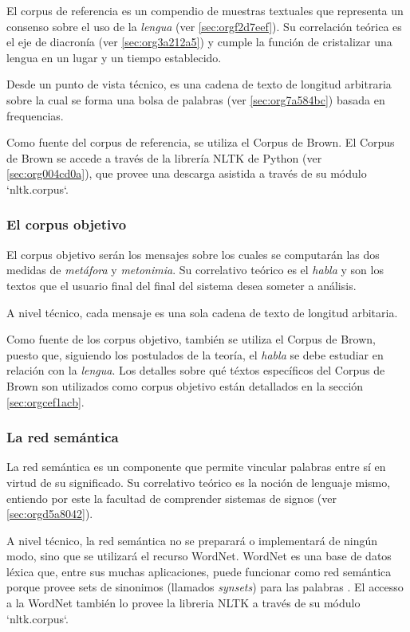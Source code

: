 \documentclass[12pt,letterpaper,twoside]{article}
\begin{document}
El corpus de referencia es un compendio de muestras textuales que
representa un consenso sobre el uso de la \emph{lengua}
(ver \ref{sec:orgf2d7eef}). Su correlación teórica es el eje de diacronía (ver
\ref{sec:org3a212a5}) y cumple la función de cristalizar una
lengua en un lugar y un tiempo establecido.

Desde un punto de vista técnico, es una cadena de texto de
longitud arbitraria sobre la cual se forma una bolsa de palabras
(ver \ref{sec:org7a584bc}) basada en frequencias.

Como fuente del corpus de referencia, se utiliza el Corpus de
Brown. El Corpus de Brown se accede a través de la librería NLTK
de Python (ver \ref{sec:org004cd0a}), que provee una descarga asistida a través
de su módulo `nltk.corpus`.


\subsubsection{El corpus objetivo}
\label{sec:org58e41f0}

El corpus objetivo serán los mensajes sobre los cuales se
computarán las dos medidas de \emph{metáfora} y \emph{metonimia}.  Su
correlativo teórico es el \emph{habla} y son los textos que el usuario
final del final del sistema desea someter a análisis.

A nivel técnico, cada mensaje es una sola cadena de texto de
longitud arbitaria.

Como fuente de los corpus objetivo, también se utiliza el Corpus
de Brown, puesto que, siguiendo los postulados de la teoría, el
\emph{habla} se debe estudiar en relación con la \emph{lengua}. Los
detalles sobre qué téxtos específicos del Corpus de Brown son
utilizados como corpus objetivo están detallados en la sección
\ref{sec:orgcef1acb}.



\subsubsection{La red semántica}
\label{sec:orgdbfb869}

La red semántica es un componente que permite vincular palabras
entre sí en virtud de su significado. Su correlativo teórico
es la noción de lenguaje mismo, entiendo por este la facultad
de comprender sistemas de signos (ver \ref{sec:orgd5a8042}).

A nivel técnico, la red semántica no se preparará o implementará
de ningún modo, sino que se utilizará el recurso WordNet. WordNet
es una base de datos léxica que, entre sus muchas aplicaciones,
puede funcionar como red semántica porque provee sets de
sinonimos (llamados \emph{synsets}) para las palabras
\cite{fellbaum_1998}. El accesso a la WordNet también lo provee la
libreria NLTK a través de su módulo `nltk.corpus`.
\end{document}
